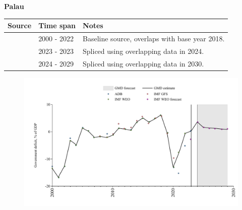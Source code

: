 \documentclass[12pt,a4paper,landscape]{article}
\begin{document}
\begin{adjustbox}{max totalsize={\paperwidth}{\paperheight},center}
\begin{minipage}[t][\textheight][t]{\textwidth}
\vspace*{0.5cm}
{}
\begin{center}
{\Large\bfseries Palau}
\end{center}
\vspace{0.5cm}
\begin{table}[H]
\centering
\small
\begin{tabular}{|l|l|l|}
\hline
\textbf{Source} & \textbf{Time span} & \textbf{Notes} \\
\hline
\rowcolor{white}\cite{IMF_WEO}& 2000 - 2022 &Baseline source, overlaps with base year 2018.\\
\rowcolor{lightgray}\cite{ADB}& 2023 - 2023 &Spliced using overlapping data in 2024.\\
\rowcolor{white}\cite{IMF_WEO_forecast}& 2024 - 2029 &Spliced using overlapping data in 2030.\\
\hline
\end{tabular}
\end{table}
\begin{figure}[H]
\centering
\includegraphics[width=\textwidth,height=0.6\textheight,keepaspectratio]{graphs/PLW_govdef_GDP.pdf}
\end{figure}
\end{minipage}
\end{adjustbox}
\end{document}
